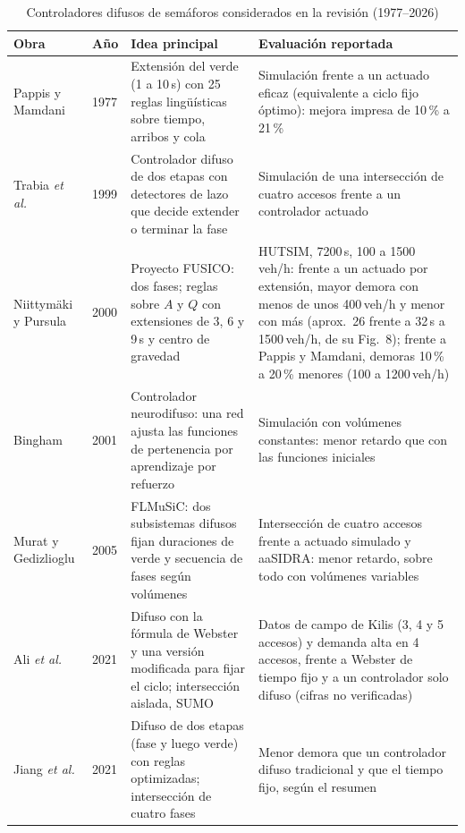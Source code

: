 \documentclass[journal]{IEEEtran}
\begin{document}
\begin{table}[!t]
\caption{Controladores difusos de semáforos considerados en la revisión (1977--2026)}
\label{tab:difusos}
\centering
\footnotesize
\begin{tabular}{@{}p{}p{}p{}p{}@{}}
\toprule
Obra & Año & Idea principal & Evaluación reportada \\
\midrule
Pappis y Mamdani \cite{Pappis1977} & 1977 & Extensión del verde (1 a 10\,s) con 25 reglas lingüísticas sobre tiempo, arribos y cola & Simulación frente a un actuado eficaz (equivalente a ciclo fijo óptimo): mejora impresa de 10\,\% a 21\,\% \\
Trabia \emph{et al.} \cite{Trabia1999} & 1999 & Controlador difuso de dos etapas con detectores de lazo que decide extender o terminar la fase & Simulación de una intersección de cuatro accesos frente a un controlador actuado \\
Niittymäki y Pursula \cite{Niittymaki2000} & 2000 & Proyecto FUSICO: dos fases; reglas sobre $A$ y $Q$ con extensiones de 3, 6 y 9\,s y centro de gravedad & HUTSIM, 7200\,s, 100 a 1500\,veh/h: frente a un actuado por extensión, mayor demora con menos de unos 400\,veh/h y menor con más (aprox.\ 26 frente a 32\,s a 1500\,veh/h, de su Fig.~8); frente a Pappis y Mamdani, demoras 10\,\% a 20\,\% menores (100 a 1200\,veh/h) \\
Bingham \cite{Bingham2001} & 2001 & Controlador neurodifuso: una red ajusta las funciones de pertenencia por aprendizaje por refuerzo & Simulación con volúmenes constantes: menor retardo que con las funciones iniciales \\
Murat y Gedizlioglu \cite{Murat2005} & 2005 & FLMuSiC: dos subsistemas difusos fijan duraciones de verde y secuencia de fases según volúmenes & Intersección de cuatro accesos frente a actuado simulado y aaSIDRA: menor retardo, sobre todo con volúmenes variables \\
Ali \emph{et al.} \cite{Ali2021} & 2021 & Difuso con la fórmula de Webster y una versión modificada para fijar el ciclo; intersección aislada, SUMO & Datos de campo de Kilis (3, 4 y 5 accesos) y demanda alta en 4 accesos, frente a Webster de tiempo fijo y a un controlador solo difuso (cifras no verificadas) \\
Jiang \emph{et al.} \cite{Jiang2021} & 2021 & Difuso de dos etapas (fase y luego verde) con reglas optimizadas; intersección de cuatro fases & Menor demora que un controlador difuso tradicional y que el tiempo fijo, según el resumen \\

\end{tabular}
\end{table}
\end{document}
